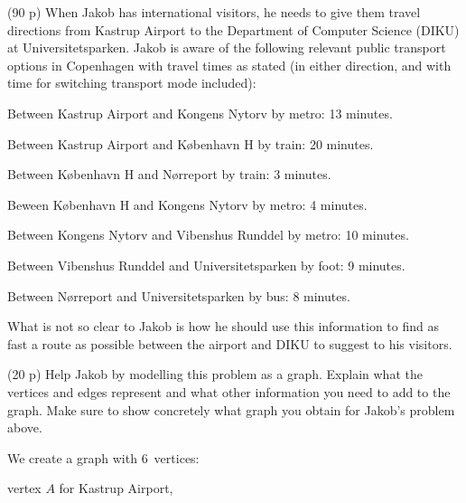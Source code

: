\documentclass{jn-pset}
\begin{document}
\begin{problem}%
  \label{problem:shortest-path}%
  (90 p)
  When Jakob has international visitors, he needs to give them travel
  directions from Kastrup Airport to the
  Department of Computer Science (DIKU) at Universitetsparken.  Jakob
  is aware of the following relevant public transport options in
  Copenhagen with travel times as stated
  (in either direction, and with time for switching transport mode included):
  \begin{compactitem}
  \item
    Between Kastrup Airport and Kongens Nytorv by metro: 13 minutes.
    
  \item
    Between Kastrup Airport and København H by train: 20 minutes.
    
  \item
    Between København H and Nørreport by train: 3 minutes.
    
  \item
    Beween København H and Kongens Nytorv by metro: 4 minutes.
    
  \item
    Between Kongens Nytorv and Vibenshus Runddel by metro: 10 minutes.

  \item
    Between Vibenshus Runddel and Universitetsparken by foot: 9 minutes.
    
  \item
    Between Nørreport and Universitetsparken by bus: 8 minutes.

  \end{compactitem}
%
  What is not so clear to Jakob is how he should use this information
  to find
  as fast a route as possible
  between the airport and DIKU to suggest to his
  visitors.
  
  \begin{subproblem}
    {(20 p)}
    {\ignorespaces}
    Help Jakob by modelling this problem as a graph.
    Explain what the vertices and edges represent and what other
    information you need to add to the graph.
    Make sure to show concretely what graph you obtain
    for Jakob's problem above.
  \end{subproblem}


\begin{solution}
  We create a graph with $6$~vertices:
  \begin{compactitem}
  \item vertex 
    $A$ for Kastrup Airport, 


\end{compactitem}
\end{solution}
\end{problem}
\end{document}
